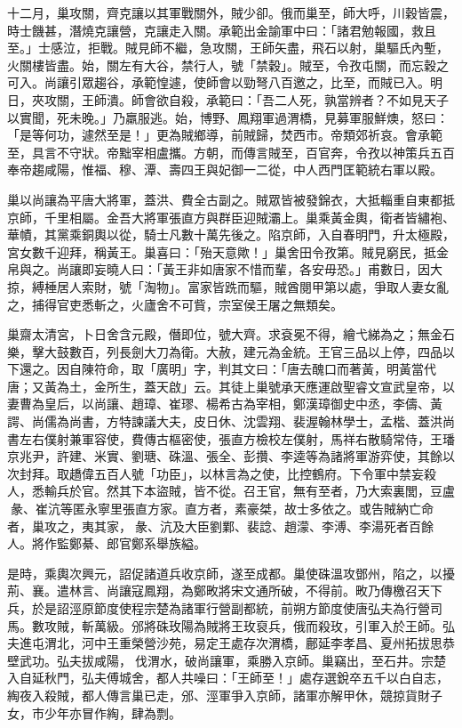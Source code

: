 \begin{pinyinscope}
 十二月，巢攻關，齊克讓以其軍戰關外，賊少卻。俄而巢至，師大呼，川穀皆震，時士饑甚，潛燒克讓營，克讓走入關。承範出金諭軍中曰：「諸君勉報國，救且至。」士感泣，拒戰。賊見師不繼，急攻關，王師矢盡，飛石以射，巢驅氏內塹，火關樓皆盡。始，關左有大谷，禁行人，號「禁穀」。賊至，令孜屯關，而忘穀之可入。尚讓引眾趨谷，承範惶遽，使師會以勁弩八百邀之，比至，而賊已入。明日，夾攻關，王師潰。師會欲自殺，承範曰：「吾二人死，孰當辨者？不如見天子以實聞，死未晚。」乃羸服逃。始，博野、鳳翔軍過渭橋，見募軍服鮮燠，怒曰：「是等何功，遽然至是！」更為賊鄉導，前賊歸，焚西市。帝類郊祈哀。會承範至，具言不守狀。帝黜宰相盧攜。方朝，而傳言賊至，百官奔，令孜以神策兵五百奉帝趨咸陽，惟福、穆、潭、壽四王與妃御一二從，中人西門匡範統右軍以殿。



 巢以尚讓為平唐大將軍，蓋洪、費全古副之。賊眾皆被發錦衣，大抵輜重自東都抵京師，千里相屬。金吾大將軍張直方與群臣迎賊灞上。巢乘黃金輿，衛者皆繡袍、華幘，其黨乘銅輿以從，騎士凡數十萬先後之。陷京師，入自春明門，升太極殿，宮女數千迎拜，稱黃王。巢喜曰：「殆天意歟！」巢舍田令孜第。賊見窮民，抵金帛與之。尚讓即妄曉人曰：「黃王非如唐家不惜而輩，各安毋恐。」甫數日，因大掠，縛棰居人索財，號「淘物」。富家皆跣而驅，賊酋閱甲第以處，爭取人妻女亂之，捕得官吏悉斬之，火廬舍不可貲，宗室侯王屠之無類矣。



 巢齋太清宮，卜日舍含元殿，僭即位，號大齊。求袞冕不得，繪弋綈為之；無金石樂，擊大鼓數百，列長劍大刀為衛。大赦，建元為金統。王官三品以上停，四品以下還之。因自陳符命，取「廣明」字，判其文曰：「唐去醜口而著黃，明黃當代唐；又黃為土，金所生，蓋天啟」云。其徒上巢號承天應運啟聖睿文宣武皇帝，以妻曹為皇后，以尚讓、趙璋、崔璆、楊希古為宰相，鄭漢璋御史中丞，李儔、黃諤、尚儒為尚書，方特諫議大夫，皮日休、沈雲翔、裴渥翰林學士，孟楷、蓋洪尚書左右僕射兼軍容使，費傳古樞密使，張直方檢校左僕射，馬祥右散騎常侍，王璠京兆尹，許建、米實、劉瑭、硃溫、張全、彭攢、李逵等為諸將軍游弈使，其餘以次封拜。取趫偉五百人號「功臣」，以林言為之使，比控鶴府。下令軍中禁妄殺人，悉輸兵於官。然其下本盜賊，皆不從。召王官，無有至者，乃大索裏閭，豆盧彖、崔沆等匿永寧里張直方家。直方者，素豪桀，故士多依之。或告賊納亡命者，巢攻之，夷其家，彖、沆及大臣劉鄴、裴諗、趙濛、李溥、李湯死者百餘人。將作監鄭綦、郎官鄭系舉族縊。



 是時，乘輿次興元，詔促諸道兵收京師，遂至成都。巢使硃溫攻鄧州，陷之，以擾荊、襄。遣林言、尚讓寇鳳翔，為鄭畋將宋文通所破，不得前。畋乃傳檄召天下兵，於是詔涇原節度使程宗楚為諸軍行營副都統，前朔方節度使唐弘夫為行營司馬。數攻賊，斬萬級。邠將硃玫陽為賊將王玫裒兵，俄而殺玫，引軍入於王師。弘夫進屯渭北，河中王重榮營沙苑，易定王處存次渭橋，鄜延李孝昌、夏州拓拔思恭壁武功。弘夫拔咸陽，伐渭水，破尚讓軍，乘勝入京師。巢竊出，至石井。宗楚入自延秋門，弘夫傅城舍，都人共噪曰：「王師至！」處存選銳卒五千以白自志，綯夜入殺賊，都人傳言巢已走，邠、涇軍爭入京師，諸軍亦解甲休，競掠貨財子女，市少年亦冒作綯，肆為剽。




\end{pinyinscope}
